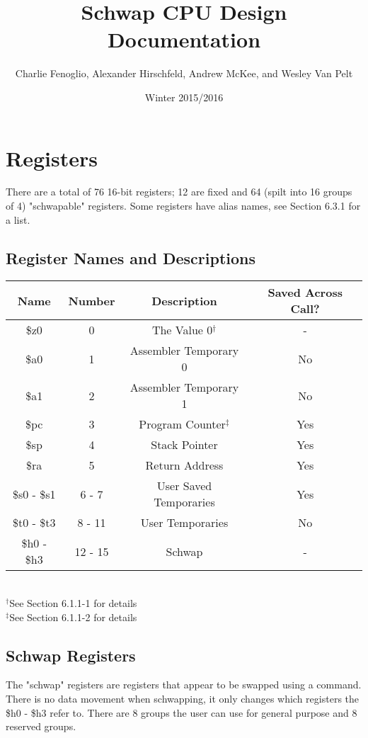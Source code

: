 \documentclass{article}
\title{Schwap CPU Design Documentation}
\author{Charlie Fenoglio, Alexander Hirschfeld, Andrew McKee, and Wesley Van Pelt}
\date{Winter 2015/2016}
\begin{document}
\maketitle
\section{Registers}
	There are a total of 76 16-bit registers; 12 are fixed and 64 (spilt into 16 groups of 4) "schwapable" registers.  Some registers have alias names, see Section 6.3.1 for a list.
	\subsection{Register Names and Descriptions}
		\begin{center}
			\begin{tabular}{| c | c | c | c |}
				\hline
				    Name        & Number  & Description            & Saved Across Call? \\ \hline
				    \$z0        & 0       & The Value 0$^\dagger$  & -   \\ \hline
				    \$a0        & 1       & Assembler Temporary 0  & No  \\ \hline
				    \$a1        & 2       & Assembler Temporary 1  & No  \\ \hline
				    \$pc        & 3       & Program Counter$^\ddagger$& Yes \\ \hline
				    \$sp        & 4       & Stack Pointer          & Yes \\ \hline
				    \$ra        & 5       & Return Address         & Yes \\ \hline
				    \$s0 - \$s1 & 6 - 7   & User Saved Temporaries & Yes \\ \hline
				    \$t0 - \$t3 & 8 - 11  & User Temporaries       & No  \\ \hline
				    \$h0 - \$h3 & 12 - 15 & Schwap                 & -   \\
				\hline
			\end{tabular} \\
			$^\dagger$See Section 6.1.1-1 for details\\
			$^\ddagger$See Section 6.1.1-2 for details
		\end{center}
	\subsection{Schwap Registers}
		The "schwap" registers are registers that appear to be swapped using a command.  There is no data movement when schwapping, it only changes which registers the \$h0 - \$h3 refer to.  There are 8 groups the user can use for general purpose and 8 reserved groups.
\end{document}
